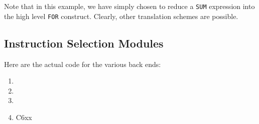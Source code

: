 Note that in this example, we have simply chosen to reduce
a \verb|SUM| expression into the high level \verb|FOR| construct.
Clearly, other translation schemes are possible.

\subsection{Instruction Selection Modules}
Here are the actual code for the various back ends:
\begin{enumerate}
  \item {}
  \item {}
  \item {}
  \item C6xx 
\end{enumerate}
